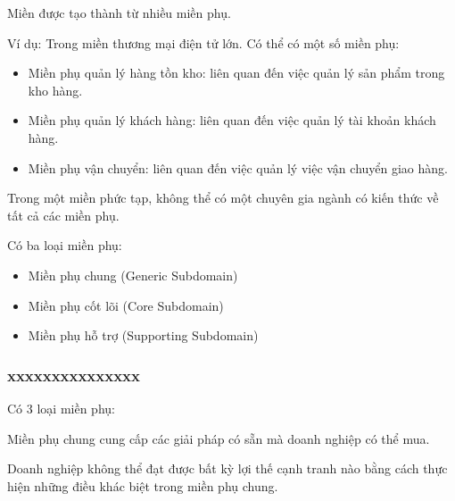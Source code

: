 Miền được tạo thành từ nhiều miền phụ.

Ví dụ: Trong miền thương mại điện tử lớn. Có thể có một số miền phụ:

\begin{itemize}

\item Miền phụ quản lý hàng tồn kho: liên quan đến việc quản lý sản phẩm trong kho hàng.

\item Miền phụ quản lý khách hàng: liên quan đến việc quản lý tài khoản khách hàng.

\item Miền phụ vận chuyển: liên quan đến việc quản lý việc vận chuyển giao hàng.

\end{itemize}

Trong một miền phức tạp, không thể có một chuyên gia ngành có kiến thức về tất cả các miền phụ.

Có ba loại miền phụ:

\begin{itemize}

\item Miền phụ chung (Generic Subdomain)

\item Miền phụ cốt lõi (Core Subdomain)

\item Miền phụ hỗ trợ (Supporting Subdomain)

\end{itemize}



\subsubsection{xxxxxxxxxxxxxxx}


Có 3 loại miền phụ:


Miền phụ chung cung cấp các giải pháp có sẵn mà doanh nghiệp có thể mua.

Doanh nghiệp không thể đạt được bất kỳ lợi thế cạnh tranh nào bằng cách thực hiện những điều khác biệt trong miền phụ chung.


